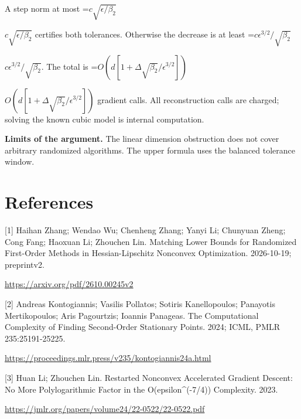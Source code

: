 \documentclass[10pt,a4paper]{article}
\newcommand{\AtlasMath}[1]{\par\begingroup\centering\setbox0=\hbox{$\displaystyle #1$}\ifdim\wd0>1.4\linewidth\typeout{ATLAS WIDE FORMULA: \the\wd0}\fi\ifdim\wd0>\linewidth\resizebox{\linewidth}{!}{\box0}\else\box0\fi\par\endgroup}
\newcommand{\AtlasInlineMath}[1]{\begingroup\setbox0=\hbox{$#1$}\ifdim\wd0>.4\linewidth\endgroup\AtlasMath{#1}\else\endgroup$#1$\fi}
\begin{document}
A step norm at most \AtlasInlineMath{c\sqrt{\epsilon/\beta_2}} certifies both tolerances. Otherwise the decrease is at least \AtlasInlineMath{c\epsilon^{3/2}/\sqrt{\beta_2}}. The total is \AtlasInlineMath{O(d[1+\Delta\sqrt{\beta_2}/\epsilon^{3/2}])} gradient calls. All reconstruction calls are charged; solving the known cubic model is internal computation.

\textbf{Limits of the argument.} The linear dimension obstruction does not cover arbitrary randomized algorithms. The upper formula uses the balanced tolerance window.

\section{References}
[1] Haihan Zhang; Wendao Wu; Chenheng Zhang; Yanyi Li; Chunyuan Zheng; Cong Fang; Haoxuan Li; Zhouchen Lin. Matching Lower Bounds for Randomized First-Order Methods in Hessian-Lipschitz Nonconvex Optimization. 2026-10-19; preprintv2.

\url{https://arxiv.org/pdf/2610.00245v2}

[2] Andreas Kontogiannis; Vasilis Pollatos; Sotiris Kanellopoulos; Panayotis Mertikopoulos; Aris Pagourtzis; Ioannis Panageas. The Computational Complexity of Finding Second-Order Stationary Points. 2024; ICML, PMLR 235:25191-25225.

\url{https://proceedings.mlr.press/v235/kontogiannis24a.html}

[3] Huan Li; Zhouchen Lin. Restarted Nonconvex Accelerated Gradient Descent: No More Polylogarithmic Factor in the O(epsilon\textasciicircum{}(-7/4)) Complexity. 2023.

\url{https://jmlr.org/papers/volume24/22-0522/22-0522.pdf}
\end{document}
